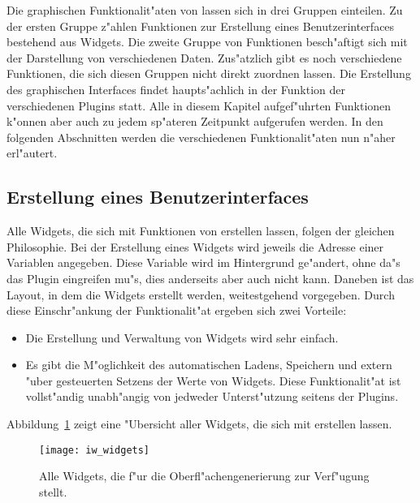 Die graphischen Funktionalit"aten von \icewing{} lassen sich in drei
Gruppen einteilen. Zu der ersten Gruppe z"ahlen Funktionen zur
Erstellung eines Benutzerinterfaces bestehend aus
Widgets. Die zweite Gruppe von Funktionen besch"aftigt
sich mit der Darstellung von verschiedenen Daten. Zus"atzlich gibt
es noch verschiedene Funktionen, die sich diesen Gruppen nicht
direkt zuordnen lassen. Die Erstellung des graphischen Interfaces
findet haupts"achlich in der Funktion  der
verschiedenen Plugins statt. Alle in diesem Kapitel aufgef"uhrten
Funktionen k"onnen aber auch zu jedem sp"ateren Zeitpunkt aufgerufen
werden. In den folgenden Abschnitten werden die verschiedenen
Funktionalit"aten nun n"aher erl"autert.

\subsection{Erstellung eines Benutzerinterfaces}
\label{sub:p_widgets}

Alle Widgets, die sich mit Funktionen von \icewing{} erstellen
lassen, folgen der gleichen Philosophie. Bei der Erstellung eines
Widgets wird jeweils die Adresse einer Variablen angegeben. Diese
Variable wird im Hintergrund ge"andert, ohne da"s das Plugin
eingreifen mu"s, dies anderseits aber auch nicht kann. Daneben ist
das Layout, in dem die Widgets erstellt werden, weitestgehend
vorgegeben. Durch diese Einschr"ankung der Funktionalit"at ergeben
sich zwei Vorteile:
\begin{itemize}
\item Die Erstellung und Verwaltung von Widgets wird sehr einfach.
\item Es gibt die M"oglichkeit des automatischen Ladens, Speichern
  und extern "uber \dacs{} gesteuerten Setzens der Werte von
  Widgets. Diese Funktionalit"at ist vollst"andig unabh"angig von
  jedweder Unterst"utzung seitens der Plugins.
\end{itemize}
Abbildung~\ref{fig:p_widgets} zeigt eine "Ubersicht aller Widgets,
die sich mit \icewing{} erstellen lassen.

\begin{figure}[htb]
  \begin{center}
    \texttt{[image: iw\_widgets]}
  \end{center}
  \caption[Die Widgets von \icewing{}]
  {Alle Widgets, die \icewing{} f"ur die Oberfl"achengenerierung zur
    Verf"ugung stellt.}
  \label{fig:p_widgets}
\end{figure}

